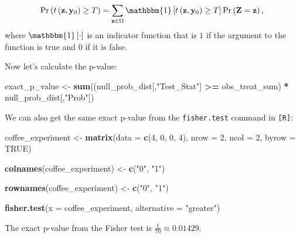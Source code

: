 \documentclass[12pt,leqno]{article}
\newenvironment{Shaded}{\begin{snugshade}}{\end{snugshade}}
\newcommand{\DataTypeTok}[1]{\textcolor[rgb]{0.13,0.29,0.53}{#1}}
\newcommand{\DecValTok}[1]{\textcolor[rgb]{0.00,0.00,0.81}{#1}}
\newcommand{\KeywordTok}[1]{\textcolor[rgb]{0.13,0.29,0.53}{\textbf{#1}}}
\newcommand{\NormalTok}[1]{#1}
\newcommand{\OperatorTok}[1]{\textcolor[rgb]{0.81,0.36,0.00}{\textbf{#1}}}
\newcommand{\OtherTok}[1]{\textcolor[rgb]{0.56,0.35,0.01}{#1}}
\newcommand{\StringTok}[1]{\textcolor[rgb]{0.31,0.60,0.02}{#1}}
\theoremstyle{newstyle}
\begin{document}
\begin{equation}
\Pr\left(t\left(\mathbf{z}, \mathbf{y}_0 \right) \geq T \right) = \sum \limits_{\mathbf{z} \in \Omega} \mathbbm{1}\left[t\left(\mathbf{z}, \mathbf{y}_0 \right) \geq T\right] \Pr\left(\mathbf{Z} = \mathbf{z}\right),
\end{equation} where \(\mathbbm{1}\left[\cdot\right]\) is an indicator
function that is \(1\) if the argument to the function is true and \(0\)
if it is false.

Now let's calculate the p-value:

\begin{Shaded}
\begin{Highlighting}[]
\NormalTok{exact_p_value <-}\StringTok{ }\KeywordTok{sum}\NormalTok{((null_prob_dist[,}\StringTok{"Test_Stat"}\NormalTok{] }\OperatorTok{>=}\StringTok{ }\NormalTok{obs_treat_sum) }\OperatorTok{*}\StringTok{ }\NormalTok{null_prob_dist[,}\StringTok{"Prob"}\NormalTok{])}
\end{Highlighting}
\end{Shaded}

We can also get the same exact p-value from the \texttt{fisher.test}
command in \texttt{[R]}:

\begin{Shaded}
\begin{Highlighting}[]
\NormalTok{coffee_experiment <-}\StringTok{ }\KeywordTok{matrix}\NormalTok{(}\DataTypeTok{data =} \KeywordTok{c}\NormalTok{(}\DecValTok{4}\NormalTok{, }\DecValTok{0}\NormalTok{, }\DecValTok{0}\NormalTok{, }\DecValTok{4}\NormalTok{),}
                            \DataTypeTok{nrow =} \DecValTok{2}\NormalTok{,}
                            \DataTypeTok{ncol =} \DecValTok{2}\NormalTok{,}
                            \DataTypeTok{byrow =} \OtherTok{TRUE}\NormalTok{)}

\KeywordTok{colnames}\NormalTok{(coffee_experiment) <-}\StringTok{ }\KeywordTok{c}\NormalTok{(}\StringTok{"0"}\NormalTok{, }\StringTok{"1"}\NormalTok{)}

\KeywordTok{rownames}\NormalTok{(coffee_experiment) <-}\StringTok{ }\KeywordTok{c}\NormalTok{(}\StringTok{"0"}\NormalTok{, }\StringTok{"1"}\NormalTok{)}

\KeywordTok{fisher.test}\NormalTok{(}\DataTypeTok{x =}\NormalTok{ coffee_experiment,}
            \DataTypeTok{alternative =} \StringTok{"greater"}\NormalTok{)}
\end{Highlighting}
\end{Shaded}

The exact p-value from the Fisher test is
\(\frac{1}{70} \approx 0.01429\).
\end{document}
